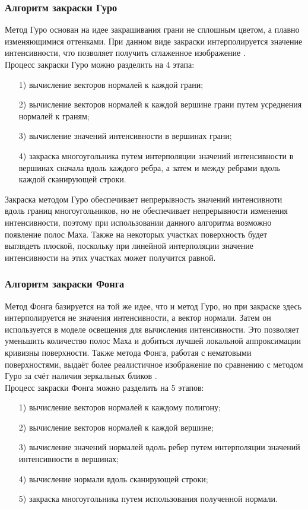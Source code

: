 \documentclass[54pt, a4paper]{article}
\begin{document}
	\subsubsection{Алгоритм закраски Гуро}
	Метод Гуро основан на идее закрашивания грани не сплошным цветом, а
	плавно изменяющимися оттенками. При данном виде закраски интерполируется значение интенсивности, что позволяет получить сглаженное изображение \cite{kur}.\\
	
	Процесс закраски Гуро можно разделить на 4 этапа:
	\begin{enumerate}
		\item[1)]вычисление векторов нормалей к каждой грани;
		\item[2)]вычисление векторов нормалей к каждой вершине грани путем усреднения
		нормалей к граням;
		\item[3)]вычисление значений интенсивности в вершинах грани;
		\item[4)] закраска многоугольника путем интерполяции значений интенсивности в вершинах сначала вдоль каждого ребра, а затем и между ребрами вдоль каждой сканирующей строки.
	\end{enumerate}

	Закраска методом Гуро обеспечивает непрерывность значений интенсивноти
	вдоль границ многоугольников, но не обеспечивает непрерывности изменения интенсивности, поэтому при использовании данного алгоритма возможно появление полос Маха. Также на некоторых участках поверхность будет выглядеть плоской, поскольку при линейной интерполяции значение интенсивности на этих участках может получится равной.
	\subsubsection{Алгоритм закраски Фонга}
	Метод Фонга базируется на той же идее, что и метод Гуро, но при закраске
	здесь интерполируется не значения интенсивности, а вектор нормали. Затем он используется в моделе освещения для вычисления интенсивности. Это позволяет уменьшить количество полос Маха и добиться лучшей локальной аппроксимации кривизны поверхности. Также метода Фонга, работая с нематовыми поверхностями, выдаёт более реалистичное изображение по сравнению с методом Гуро за счёт наличия зеркальных бликов \cite{kur}.\\
	
	Процесс закраски Фонга можно разделить на 5 этапов:
	\begin{enumerate}
		\item[1)]вычисление векторов нормалей к каждому полигону;
		\item[2)]вычисление векторов нормалей к каждой вершине;
		\item[3)]вычисление значений нормалей вдоль ребер путем интерполяции значений
		интенсивности в вершинах;
		\item[4)]вычисление нормали вдоль сканирующей строки;
		\item[5)]закраска многоугольника путем использования полученной нормали.
	\end{enumerate}
\end{document}
